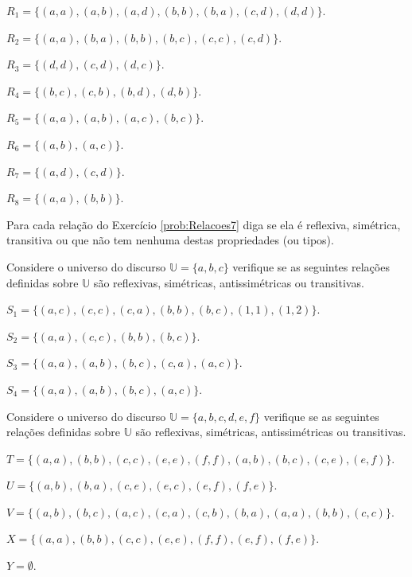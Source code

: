 \begin{exerList}
	\item $R_1 = \{(a,a),(a,b),(a,d),(b,b),(b,a),(c,d),(d,d)\}$.
	\item $R_2 = \{(a, a), (b, a), (b, b), (b, c), (c, c), (c, d)\}$.
	\item $R_3 = \{(d, d), (c, d), (d, c)\}$.
	\item $R_4 = \{(b, c), (c, b), (b, d), (d, b)\}$.
	\item $R_5 = \{(a,a),(a,b),(a,c),(b,c)\}$.
	\item $R_6 = \{(a,b),(a,c)\}$.
	\item $R_7 = \{(a,d),(c,d)\}$.
	\item $R_8 = \{(a,a),(b,b)\}$.
\end{exerList}

\begin{problem}\label{prob:Relacoes9}
	Para cada relação do Exercício \ref{prob:Relacoes7} diga se ela é reflexiva, simétrica, transitiva ou que não tem nenhuma destas propriedades (ou tipos).
\end{problem}

\begin{problem}\label{prob:Relacoes10}
	Considere o universo do discurso $\mathbb{U} = \{a, b, c\}$ verifique se as seguintes relações  definidas sobre $\mathbb{U}$ são reflexivas, simétricas, antissimétricas ou transitivas.
\end{problem}

\begin{exerList}
	\item $S_1 = \{(a, c), (c, c), (c, a), (b, b), (b, c), (1, 1), (1, 2)\}$.
	\item $S_2 = \{(a, a), (c, c), (b, b), (b, c)\}$.
	\item $S_3 = \{(a,a), (a, b), (b, c), (c, a), (a, c)\}$.
	\item $S_4 = \{(a, a), (a, b), (b, c), (a, c)\}$.
\end{exerList}

\begin{problem}\label{prob:Relacoes11}
	Considere o universo do discurso $\mathbb{U} = \{a, b, c, d, e,f\}$ verifique se as seguintes relações  definidas sobre $\mathbb{U}$ são reflexivas, simétricas, antissimétricas ou transitivas.
\end{problem}

\begin{exerList}
	\item $T = \{(a, a),  (b, b), (c, c), (e, e), (f, f), (a, b), (b, c), (c, e), (e, f)\}$.
	\item $U = \{(a, b),  (b, a), (c, e), (e, c), (e, f), (f, e)\}$.
	\item $V = \{(a, b),  (b, c), (a, c), (c, a), (c, b), (b, a), (a, a), (b, b), (c, c)\}$.
	\item $X = \{(a, a),  (b, b), (c, c), (e, e), (f, f), (e, f), (f, e)\}$.
	\item $Y = \emptyset$.
\end{exerList}

